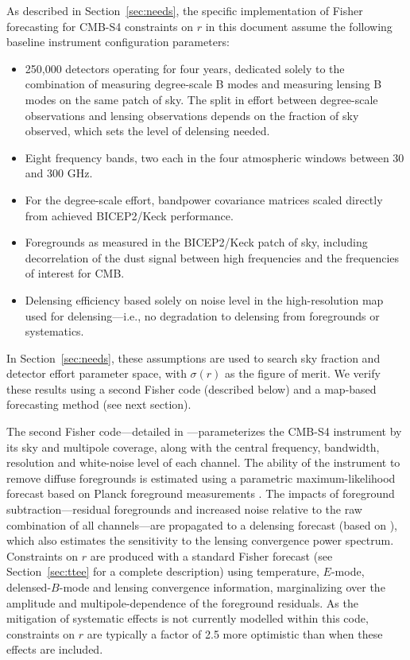 As described in Section~\ref{sec:needs}, the specific implementation of Fisher forecasting for CMB-S4 constraints
on $r$ in this document assume the following baseline instrument configuration parameters:
%
\begin{itemize}
\item{250,000 detectors operating for four years, dedicated solely to the combination of measuring degree-scale B modes and measuring lensing B modes on the same patch of sky. The split in effort between degree-scale observations and lensing observations depends on the fraction of sky observed, which sets the level of delensing needed.}
\item{Eight frequency bands, two each in the four atmospheric windows between 30 and 300 GHz.}
\item{For the degree-scale effort, bandpower covariance matrices scaled directly from achieved BICEP2/Keck performance.}
\item{Foregrounds as measured in the BICEP2/Keck patch of sky, including decorrelation of the dust signal between high frequencies and the frequencies of interest for CMB.}
\item{Delensing efficiency based solely on noise level in the high-resolution map used for delensing---i.e., no degradation to delensing from foregrounds or systematics.}
\end{itemize}
%
In Section~\ref{sec:needs}, these assumptions are used to search sky fraction and detector effort parameter space, with 
$\sigma(r)$ as the figure of merit. We verify these results using a second Fisher code (described below) and a map-based
forecasting method (see next section).

The second Fisher code---detailed in \cite{Errard:2015cxa}---parameterizes the CMB-S4 instrument by its sky and multipole coverage, along with the central frequency, bandwidth, resolution and white-noise level of each channel. The ability of the instrument to remove diffuse foregrounds is estimated using a parametric maximum-likelihood forecast \cite{Errard:2011vi,Errard:2012qx} based on Planck foreground measurements \cite{Adam:2015tpy,Adam:2015wua}. The impacts of foreground subtraction---residual foregrounds and increased noise relative to the raw combination of all channels---are propagated to a delensing forecast (based on \cite{Smith:2010gu}), which also estimates the sensitivity to the lensing convergence power spectrum. Constraints on $r$ are produced with a standard Fisher forecast (see Section~\ref{sec:ttee} for a complete description) using temperature, $E$-mode, delensed-$B$-mode and lensing convergence information, marginalizing over the amplitude and multipole-dependence of the foreground residuals. As the mitigation of systematic effects is not currently modelled within this code, constraints on $r$ are typically a factor of 2.5 more optimistic than when these effects are included.

